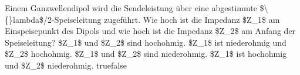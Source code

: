     {Einem Ganzwellendipol wird die Sendeleistung über eine abgestimmte \$\textbackslash\{\}lambda\$/2-Speiseleitung zugeführt. Wie hoch ist die Impedanz \$Z\_1\$ am Einspeisepunkt des Dipols und wie hoch ist die Impedanz \$Z\_2\$ am Anfang der Speiseleitung?}
    {\$Z\_1\$ und \$Z\_2\$ sind hochohmig.}
    {\$Z\_1\$ ist niederohmig und \$Z\_2\$ hochohmig.}
    {\$Z\_1\$ und \$Z\_2\$ sind niederohmig.}
    {\$Z\_1\$ ist hochohmig und \$Z\_2\$ niederohmig.}
    {true}{false}